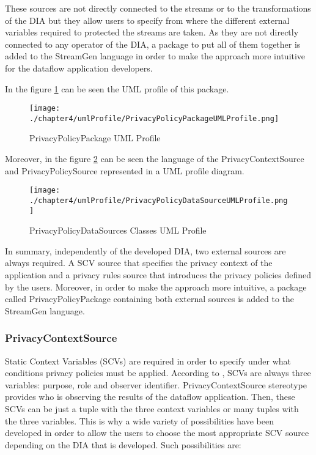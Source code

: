 These sources are not directly connected to the streams or to the transformations of the DIA but they allow users to specify from where the different external variables required to protected the streams are taken. As they are not directly connected to any operator of the DIA, a package to put all of them together is added to the StreamGen language in order to make the approach more intuitive for the dataflow application developers.

In the figure \ref{fig:PrivacyPolicyPackage UML Profile} can be seen the UML profile of this package.

\begin{figure}
\centering
{\texttt{[image: ./chapter4/umlProfile/PrivacyPolicyPackageUMLProfile.png]}}
\caption{PrivacyPolicyPackage UML Profile}
\label{fig:PrivacyPolicyPackage UML Profile}
\end{figure}

Moreover, in the figure \ref{fig:PrivacyPolicyDataSources Classes UML Profile} can be seen the language of the PrivacyContextSource and PrivacyPolicySource represented in a UML profile diagram.

\begin{figure}
\centering
{\texttt{[image: ./chapter4/umlProfile/PrivacyPolicyDataSourceUMLProfile.png]}}
\caption{PrivacyPolicyDataSources Classes UML Profile}
\label{fig:PrivacyPolicyDataSources Classes UML Profile}
\end{figure}

In summary, independently of the developed DIA, two external sources are always required. A SCV source that specifies the privacy context of the application and a privacy rules source that introduces the privacy policies defined by the users. Moreover, in order to make the approach more intuitive, a package called PrivacyPolicyPackage containing both external sources is added to the StreamGen language.

\subsubsection{PrivacyContextSource}

Static Context Variables (SCVs) are required in order to specify under what conditions privacy policies must be applied. According to \cite{privacypoliciesarticle}, SCVs are always three variables: purpose, role and observer identifier. PrivacyContextSource stereotype provides who is observing the results of the dataflow application. Then, these SCVs can be just a tuple with the three context variables or many tuples with the three variables. This is why a wide variety of possibilities have been developed in order to allow the users to choose the most appropriate SCV source depending on the DIA that is developed. Such possibilities are:


